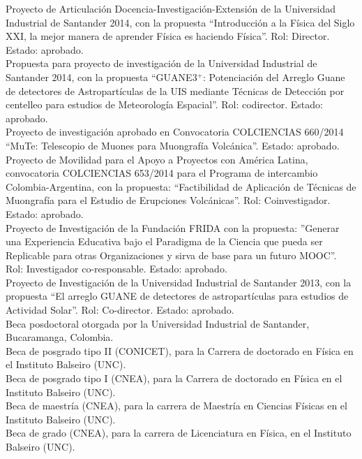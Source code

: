  Proyecto de Articulación Docencia-Investigación-Extensión de la Universidad Industrial de Santander 2014, con la propuesta ``Introducción a la Física del Siglo XXI, la mejor manera de aprender Física es haciendo Física''. Rol: Director. Estado: aprobado.\\
 Propuesta para proyecto de investigación de la Universidad Industrial de Santander 2014, con la propuesta ``GUANE3$^+$: Potenciación del Arreglo Guane de detectores de Astropartículas de la UIS mediante Técnicas de Detección por centelleo para estudios de Meteorología Espacial''. Rol: codirector. Estado: aprobado.\\
 Proyecto de investigación aprobado en Convocatoria COLCIENCIAS 660/2014 ``MuTe: Telescopio de Muones para Muongrafía Volcánica''. Estado: aprobado.\\
 Proyecto de Movilidad para el Apoyo a Proyectos con América Latina, convocatoria COLCIENCIAS 653/2014 para el Programa de intercambio Colombia-Argentina, con la propuesta: ``Factibilidad de Aplicación de Técnicas de Muongrafía para el Estudio de Erupciones Volcánicas''. Rol: Coinvestigador. Estado: aprobado.\\
 Proyecto de Investigación de la Fundación FRIDA con la propuesta: ''Generar una Experiencia Educativa bajo el Paradigma de la Ciencia que pueda ser Replicable para otras Organizaciones y sirva de base para un futuro MOOC''. Rol: Investigador co-responsable. Estado: aprobado.\\
 Proyecto de Investigación de la Universidad Industrial de Santander 2013, con la propuesta ``El arreglo GUANE de detectores de astropartículas para estudios de Actividad Solar''. Rol: Co-director. Estado: aprobado.\\
 Beca posdoctoral otorgada por la Universidad Industrial de Santander, Bucaramanga, Colombia.\\
 Beca de posgrado tipo II (CONICET), para la Carrera de doctorado en Física en el Instituto Balseiro (UNC).\\
 Beca de posgrado tipo I (CNEA), para la Carrera de doctorado en Física en el Instituto Balseiro (UNC).\\
 Beca de maestría (CNEA), para la carrera de Maestría en Ciencias Físicas en el Instituto Balseiro (UNC).\\
 Beca de grado (CNEA), para la carrera de Licenciatura en Física, en el Instituto Balseiro (UNC).\\
\fi
\fi